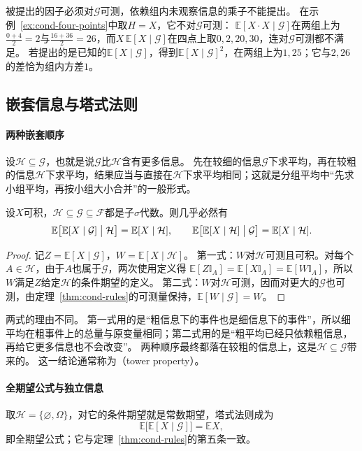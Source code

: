 被提出的因子必须对$\mathcal G$可测，依赖组内未观察信息的乘子不能提出。
在示例~\ref{ex:cond-four-points}中取$H=X$，它不对$\mathcal G$可测：
$\mathbb E[X\cdot X\mid\mathcal G]$在两组上为$\frac{0+4}{2}=2$与$\frac{16+36}{2}=26$，而$X\,\mathbb E[X\mid\mathcal G]$在四点上取$0,2,20,30$，连对$\mathcal G$可测都不满足。
若提出的是已知的$\mathbb E[X\mid\mathcal G]$，得到$\mathbb E[X\mid\mathcal G]^2$，在两组上为$1,25$；它与$2,26$的差恰为组内方差$1$。

\subsection{嵌套信息与塔式法则}

\paragraph{两种嵌套顺序}
设$\mathcal H\subseteq\mathcal G$，也就是说$\mathcal G$比$\mathcal H$含有更多信息。
先在较细的信息$\mathcal G$下求平均，再在较粗的信息$\mathcal H$下求平均，结果应当与直接在$\mathcal H$下求平均相同；这就是分组平均中“先求小组平均，再按小组大小合并”的一般形式。

\begin{theorem}[塔式法则]
\label{thm:cond-tower}
设$X$可积，$\mathcal H\subseteq\mathcal G\subseteq\mathcal F$都是子$\sigma$代数。则几乎必然有
\[
  \mathbb E\bigl[\mathbb E[X\mid\mathcal G]\bigm|\mathcal H\bigr]=\mathbb E[X\mid\mathcal H],\qquad
  \mathbb E\bigl[\mathbb E[X\mid\mathcal H]\bigm|\mathcal G\bigr]=\mathbb E[X\mid\mathcal H].
\]
\end{theorem}

\begin{proof}
记$Z=\mathbb E[X\mid\mathcal G]$，$W=\mathbb E[X\mid\mathcal H]$。
第一式：$W$对$\mathcal H$可测且可积。对每个$A\in\mathcal H$，由于$A$也属于$\mathcal G$，两次使用定义得
$\mathbb E[Z\mathbb I_A]=\mathbb E[X\mathbb I_A]=\mathbb E[W\mathbb I_A]$，所以$W$满足$Z$给定$\mathcal H$的条件期望的定义。
第二式：$W$对$\mathcal H$可测，因而对更大的$\mathcal G$也可测，由定理~\ref{thm:cond-rules}的可测量保持，$\mathbb E[W\mid\mathcal G]=W$。
\end{proof}

两式的理由不同。
第一式用的是“粗信息下的事件也是细信息下的事件”，所以细平均在粗事件上的总量与原变量相同；第二式用的是“粗平均已经只依赖粗信息，再给它更多信息也不会改变”。
两种顺序最终都落在较粗的信息上，这是$\mathcal H\subseteq\mathcal G$带来的。
这一结论通常称为（tower property）。

\paragraph{全期望公式与独立信息}
取$\mathcal H=\{\varnothing,\Omega\}$，对它的条件期望就是常数期望，塔式法则成为
\[
  \mathbb E\bigl[\mathbb E[X\mid\mathcal G]\bigr]=\mathbb EX,
\]
即全期望公式；它与定理~\ref{thm:cond-rules}的第五条一致。

